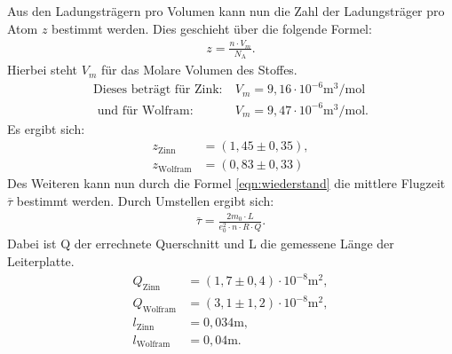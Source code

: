 Aus den Ladungsträgern pro Volumen kann nun die Zahl der Ladungsträger pro Atom $z$
bestimmt werden. Dies geschieht über die folgende Formel:
\begin{align}
  z=\frac{n \cdot V_m}{N_\mathrm{A}}.
\end{align}
Hierbei steht $V_m$ für das Molare Volumen des Stoffes.
\begin{align*}
\text{Dieses beträgt für Zink:}& \ V_m=9,16\cdot10^{-6}\si{\meter\tothe{3}\per\mol}\\
\text{ und für Wolfram}:& \ V_m=9,47\cdot10^{-6}\si{\meter\tothe{3}\per\mol}.
\end{align*}
Es ergibt sich:
\begin{align}
z_\mathrm{Zinn}&=(1,45\pm0,35),\\ %
z_\mathrm{Wolfram}&=(0,83\pm0,33)
\end{align}
Des Weiteren kann nun durch die Formel \eqref{eqn:wiederstand} die mittlere
Flugzeit $\overline\tau$ bestimmt werden. Durch Umstellen ergibt sich:
\begin{align}
  \overline{\tau}=\frac{2m_0\cdot L}{e_0^2 \cdot n \cdot R \cdot Q}.
\end{align}
Dabei ist Q der errechnete Querschnitt und L die gemessene Länge der Leiterplatte.
\begin{align*}
  Q_\mathrm{Zinn}&=(1,7\pm0,4)\cdot10^{-8}\si{\square\meter},\\
  Q_\mathrm{Wolfram}&=(3,1\pm1,2)\cdot10^{-8}\si{\square\meter},\\
l_\mathrm{Zinn}&=0,034\si{\meter},\\
l_\mathrm{Wolfram}&=0,04\si{\meter}.\\
\end{align*}

